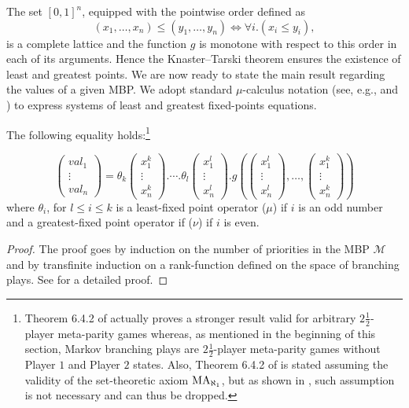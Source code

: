 The set $[0,1]^n$, equipped with the pointwise order defined as \[(x_1,\dots,x_n)\!\leq\!(y_1,\dots,y_n) \Leftrightarrow \forall i. (x_i\leq y_i),\] is a complete lattice and the function $g$ is monotone with respect to this order in each of its arguments. Hence the Knaster--Tarski theorem ensures the existence of least and greatest points.  We are now ready to state the main result regarding the values of a given MBP. We adopt standard $\mu$-calculus notation (see, e.g., \cite{Rudiments2001} and \cite{MioThesis,MIO2012b}) to express systems of least and greatest fixed-points equations.
\begin{theorem}\label{main_theorem_MBP}
\label{corr1}
The following equality holds:\footnote{Theorem 6.4.2 of \cite{MioThesis} actually proves a stronger result valid for arbitrary $2\frac{1}{2}$-player meta-parity games whereas, as mentioned in the beginning of this section, Markov branching plays are $2\frac{1}{2}$-player meta-parity games without Player $1$ and Player $2$ states. Also, Theorem 6.4.2 of \cite{MioThesis} is stated assuming the validity of the set-theoretic axiom $\textnormal{MA}_{\aleph_1}$, but as shown in \cite{GMMS2014}, such assumption is not necessary and can thus be dropped. 
}


\[ 
\begin{pmatrix} 
val_1\\ 
\vdots\\
val_n
\end{pmatrix}
=
\theta_k
\begin{pmatrix} 
x^k_1\\ 
\vdots\\
x^k_n
\end{pmatrix}.
\cdots
.\theta_l
\begin{pmatrix} 
x^l_1\\ 
\vdots\\
x^l_n
\end{pmatrix}.
g(\begin{pmatrix} 
x^l_1\\ 
\vdots\\
x^l_n
\end{pmatrix},
\ldots,
\begin{pmatrix} 
x^k_1\\ 
\vdots\\
x^k_n
\end{pmatrix}) \]
where $\theta_i$, for $l \!\leq\! i\! \leq\! k$ is a least-fixed point operator ($\mu$) if $i$ is an odd number and a greatest-fixed point operator if ($\nu$) if $i$ is even.
\end{theorem}
\begin{proof}
The proof goes by induction on the number of priorities in the MBP $\mathcal{M}$ and by transfinite induction on a rank-function defined on the space of branching plays.  See \cite{MioThesis} for a detailed proof.
\end{proof}

